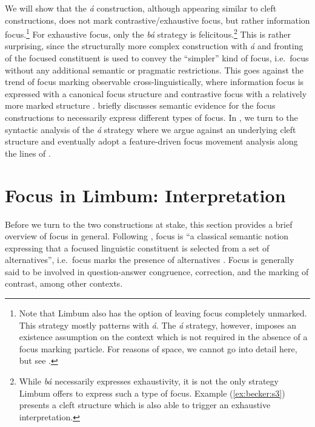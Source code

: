 \documentclass[output=paper,
modfonts
]{langscibook}
\begin{document}
We will show that the \textit{á} construction, although appearing similar to cleft constructions, does not mark contrastive/exhaustive focus, but rather information focus.\footnote{\label{footnote:becker:fn1}Note that Limbum also has the option of leaving focus completely unmarked. This strategy mostly patterns with {\em\'a}. The {\em \'a} strategy, however, imposes an existence assumption \citep{Dryer1996} on the context which is not required in the absence of a focus marking particle. For reasons of space, we cannot go into detail here, but see \citet{Driemeletal2018}.} For exhaustive focus, only the \textit{bá} strategy is felicitous.\footnote{While {\em b\'a} necessarily expresses exhaustivity, it is not the only strategy Limbum offers to express such a type of focus. Example (\ref{ex:becker:s3}) presents a cleft structure which is also able to trigger an exhaustive interpretation.} This is rather surprising, since the structurally more complex construction with \textit{á} and fronting of the focused constituent is used to convey the ``simpler'' kind of focus, i.e.\ focus without any additional semantic or pragmatic restrictions. This goes against the trend of focus marking observable cross-linguistically, where information focus is expressed with a canonical focus structure and contrastive focus with a relatively more marked structure \citep{Zimmermann2011a}.  briefly discusses semantic evidence for the focus constructions to necessarily express different types of focus. In , we turn to the syntactic analysis of the {\em \'a} strategy where we argue against an underlying cleft structure and eventually adopt a feature-driven focus movement analysis along the lines of \citet{Cable2010}.



\section{Focus in Limbum: Interpretation}\label{sec:becker:semantics}

Before we turn to the two constructions at stake, this section provides a brief overview of focus in general. Following \citet[2]{Zimmermann2010}, focus is ``a classical semantic notion expressing that a focused linguistic constituent is selected from a set of alternatives'', i.e.\ focus marks the presence of alternatives \citep{Rooth1992a,Krifk2008}. Focus is generally said to be involved in question-answer congruence, correction, and the marking of contrast, among other contexts.
\end{document}

